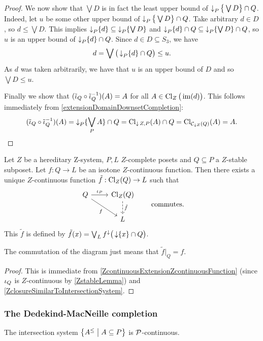 \begin{proof}
We now show that $\bigvee D$ is in fact the least upper bound of $\operatorname{\downarrow}_P\big\{\bigvee D\big\} \cap Q$. Indeed, let $u$ be some other upper bound of $\operatorname{\downarrow}_P\big\{\bigvee D\big\} \cap Q$. Take arbitrary $d\in D$, so $d\leq \bigvee D$. This implies $\operatorname{\downarrow}_P\{d\} \subseteq \operatorname{\downarrow}_P \{\bigvee D\}$ and $\operatorname{\downarrow}_P\{d\} \cap Q \subseteq \operatorname{\downarrow}_P \{\bigvee D\} \cap Q$, so $u$ is an upper bound of $\operatorname{\downarrow}_P\{d\} \cap Q$. Since $d\in D\subseteq S_3$, we have
\[ d = \bigvee \big(\operatorname{\downarrow}_P\{d\} \cap Q\big) \leq u. \]
As $d$ was taken arbitrarily, we have that $u$ is an upper bound of $D$ and so $\bigvee D \leq u$.

Finally we show that $(\tilde{\operatorname{\iota}}_Q\circ \tilde{\operatorname{\iota}}_Q^{-1})(A) = A$ for all $A\in \operatorname{Cl}_Z\big(\operatorname{im}(d)\big)$. This follows immediately from \ref{extensionDomainDownsetCompletion}:
\[ (\tilde{\operatorname{\iota}}_Q\circ \tilde{\operatorname{\iota}}_Q^{-1})(A) = \operatorname{\downarrow}_P \{\bigvee_P A\} \cap Q = \operatorname{Cl}_{\operatorname{\downarrow} Z, P}(A) \cap Q = \operatorname{Cl}_{\mathcal{C}_{\downarrow Z}(Q)}(A) = A. \]
\end{proof}

\begin{proposition}
Let $Z$ be a hereditary $\mathrm{Z}$-system, $P,L$ $Z$-complete posets and $Q \subseteq P$ a $Z$-stable subposet. Let $f: Q\to L$ be an isotone $Z$-continuous function. Then there exists a unique $Z$-continuous function $\tilde{f}: \operatorname{Cl}_Z(Q) \to L$ such that
\[ \begin{tikzcd}
Q \ar[r, "\incl_P"] \ar[dr, swap, "f"] & \Closure_{Z}(Q) \ar[d, dashed, "{\tilde{f}}"] \\ {} & L
\end{tikzcd} \qquad \text{commutes.} \]
This $\tilde{f}$ is defined by $\tilde{f}(x) = \bigvee_L f^\downarrow\big(\operatorname{\downarrow}\{x\}\cap Q\big)$.
\end{proposition}
The commutation of the diagram just means that $\tilde{f}|_Q = f$.
\begin{proof}
This is immediate from \ref{ZcontinuousExtensionZcontinuousFunction} (since $\operatorname{\iota}_Q$ is $Z$-continuous by \ref{ZstableLemma}) and \ref{ZclosureSimilarToIntersectionSystem}.
\end{proof}

\subsubsection{The Dedekind-MacNeille completion}

The intersection system $\setbuilder{A^\leq}{A\subseteq P}$ is $\operatorname{\mathcal{P}}$-continuous.

